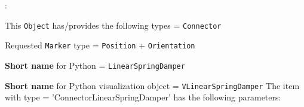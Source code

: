 \noindent {}:
\bi
  \item This \texttt{Object} has/provides the following types = \texttt{Connector}
  \item Requested \texttt{Marker} type = \texttt{Position} + \texttt{Orientation}
  \item {\bf Short name} for Python = \texttt{LinearSpringDamper}
  \item {\bf Short name} for Python visualization object = \texttt{VLinearSpringDamper}
\ei\vspace{12pt} \noindent 
The item  with type = 'ConnectorLinearSpringDamper' has the following parameters:
\vspace{-0.5cm}\\
\vspace{-0.5cm}\\
